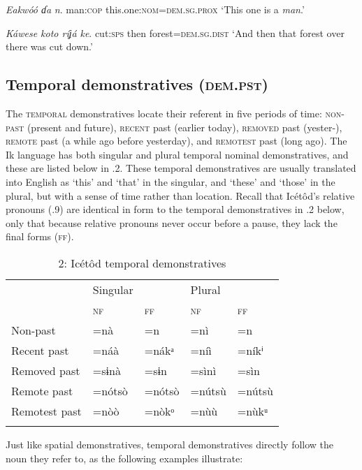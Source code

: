 \textit{Eakwóó   ɗa }\textit{n}.
man:\textsc{cop  }this.one:\textsc{nom}=\textsc{dem.sg.prox}
‘This one is a \textit{man}.’




\textit{Káwese   koto   ríʝá }\textit{ke}.
cut:\textsc{sps}   then   forest=\textsc{dem.sg.dist}
‘And then that forest over there was cut down.’






\subsection{Temporal demonstratives (\textsc{dem.pst})}


The \textsc{temporal }demonstratives locate their referent in five periods of time: \textsc{non-past} (present and future), \textsc{recent} past (earlier today), \textsc{removed} past (yester-), \textsc{remote} past (a while ago before yesterday), and \textsc{remotest }past (long ago). The Ik language has both singular and plural temporal nominal demonstratives, and these are listed below in .2. These temporal demonstratives are usually translated into English as ‘this’ and ‘that’ in the singular, and ‘these’ and ‘those’ in the plural, but with a sense of time rather than location. Recall that Icétôd’s relative pronouns (.9) are identical in form to the temporal demonstratives in .2 below, only that because relative pronouns never occur before a pause, they lack the final forms (\textsc{ff}).


\begin{table}
\caption{2: Icétôd temporal demonstratives}
\label{tab:6}


\begin{tabularx}{\textwidth}{XXXXX} & Singular &  & Plural & \\
\lsptoprule
& \textsc{nf} & \textsc{ff} & \textsc{nf} & \textsc{ff}\\
Non-past & =nà & =n & =nì & =n\\
Recent past & =náà & =nákᵃ & =níì & =níkⁱ\\
Removed past & =sɨnà & =sɨn & =sìnì & =sìn\\
Remote past & =nótsò & =nótsò & =nútsù & =nútsù\\
Remotest past & =nòò & =nòkᵒ & =nùù & =nùkᵘ\\
\lspbottomrule
\end{tabularx}
\end{table}
Just like spatial demonstratives, temporal demonstratives directly follow the noun they refer to, as the following examples illustrate:




